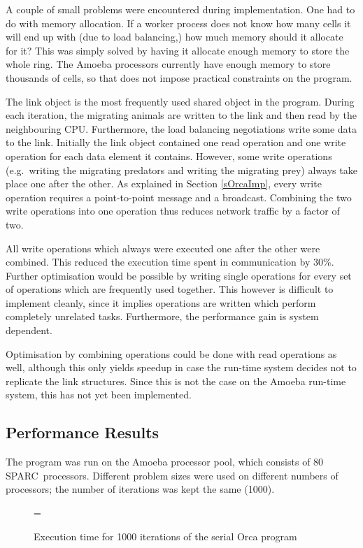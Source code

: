 A couple of small problems were encountered during implementation. One
had to do with memory allocation. If a worker process does not know how
many cells it will end up with (due to load balancing,) how much
memory should it allocate for it?
This was simply solved by having it allocate enough memory to store
the whole ring. The Amoeba processors currently have enough memory to
store thousands of cells, so that does not impose practical constraints on
the program.

The link object is the most frequently used shared object in the
program. During each iteration, the migrating animals are written to
the link and then read by the neighbouring CPU. Furthermore, the load
balancing negotiations write some data to the link. Initially the link
object contained one read operation and one write operation for each
data element it contains. However, some write operations (e.g.\
writing the migrating predators and writing the migrating prey) always
take place one after the other. As explained in Section
\ref{sOrcaImp}, every write operation requires a
point-to-point message and a broadcast. Combining the two write
operations into one operation thus reduces network traffic by a
factor of two. 

All write operations which always were executed one after the other
were combined. This reduced the execution time spent in communication
by 30\%. Further optimisation would be possible by writing single
operations for every set of operations which are frequently used together.
This however is difficult to implement cleanly, since it implies
operations are written which perform completely unrelated tasks.
Furthermore, the performance gain is system dependent.

Optimisation by combining operations could be done with read operations
as well, although this only yields speedup in case the run-time 
system decides not to replicate the link structures. Since this is not
the case on the Amoeba run-time system, this has not yet been implemented.

\subsection{Performance Results}

The program was run on the Amoeba processor pool, which consists of 80
SPARC~processors. Different problem sizes were used on different
numbers of processors; the number of iterations was kept the same (1000). 

\begin{figure}[p]
\epsfxsize=\textwidth
{}
\caption{Execution time for 1000 iterations of the serial Orca
program}
\label{fSerial}
\end{figure}

